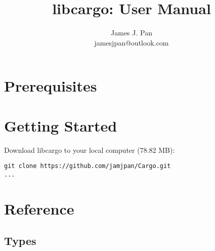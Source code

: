 \documentclass[11pt,letterpaper]{article}
\title{libcargo: User Manual}
\author{
    James J. Pan \\
    jamesjpan@outlook.com
}
\begin{document}
\maketitle

\tableofcontents

\section{Prerequisites}

\section{Getting Started}

Download libcargo to your local computer (78.82 MB):
\begin{verbatim}
git clone https://github.com/jamjpan/Cargo.git
...
\end{verbatim}

\section{Reference}

\subsection{Types}
\end{document}
